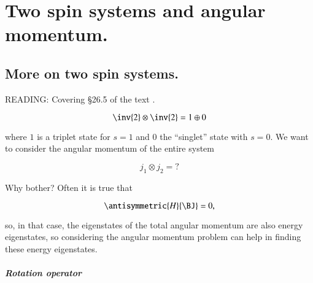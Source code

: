 %
%

\chapter{Two spin systems and angular momentum.}
\label{chap:qmTwoL17}
{}
\date{Nov 9, 2011}

\beginArtWithToc

%
%
\section{More on two spin systems.}

READING: Covering \S 26.5 of the text \cite{desai2009quantum}.

\begin{equation}\label{eqn:qmTwoL17:20}
\inv{2} \otimes \inv{2} = 1 \oplus 0
\end{equation}

where $1$ is a triplet state for $s=1$ and $0$ the ``singlet'' state with $s=0$.  We want to consider the angular momentum of the entire system

\begin{equation}\label{eqn:qmTwoL17:40}
j_1 \otimes j_2 = ?
\end{equation}

Why bother?  Often it is true that 

\begin{equation}\label{eqn:qmTwoL17:60}
\antisymmetric{H}{\BJ} = 0,
\end{equation}

so, in that case, the eigenstates of the total angular momentum are also energy eigenstates, so considering the angular momentum problem can help in finding these energy eigenstates.

\paragraph{Rotation operator}

